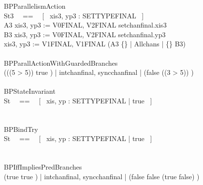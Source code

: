 \begin{circus}
 \circprocess BPParallelismAction \circdef \circbegin \\
    \circstate St3 ~~==~~ [~ xis3, yp3 : SETTYPEFINAL ~] \\
    A3 \circdef xis3, yp3 := V0FINAL, V2FINAL \circseq setchanfinal.xis3 \then \Skip \\
    B3 \circdef xis3, yp3 := V0FINAL, V2FINAL \circseq setchanfinal.yp3 \then \Skip \\
    \circspot xis3, yp3 := V1FINAL, V1FINAL \circseq (A3 \lpar \{\} | Allchans | \{\} \rpar B3) \\
 \circend \\

 \circprocess BPParallActionWithGuardedBranches \circdef \circbegin \\
    \circspot (\lcircguard (\lnot (5 > 5)) \land true \rcircguard \circguard \Skip) \lpar | \lchanset intchanfinal, syncchanfinal \rchanset | \rpar (\lcircguard false \lor (\lnot (3 > 5)) \rcircguard \circguard \Skip) \\
 \circend \\


 \circprocess BPStateInvariant \circdef \circbegin \\
    \circstate St ~~==~~ [~ xis, yp : SETTYPEFINAL | true ~] \\
    \circspot \Skip \\
 \circend \\

 \circprocess BPBindTry \circdef \circbegin \\
    \circstate St ~~==~~ [~ xis, yp : SETTYPEFINAL | true ~] \\
    \circspot \Skip \\
 \circend \\

 \circprocess BPIffImpliesPredBranches \circdef \circbegin \\
    \circspot (\lcircguard true \iff true \rcircguard \circguard \Skip) \lpar | \lchanset intchanfinal, syncchanfinal \rchanset | \rpar (\lcircguard false \iff false \lor (true \implies false) \rcircguard \circguard \Skip) \\
 \circend \\


\end{circus}
